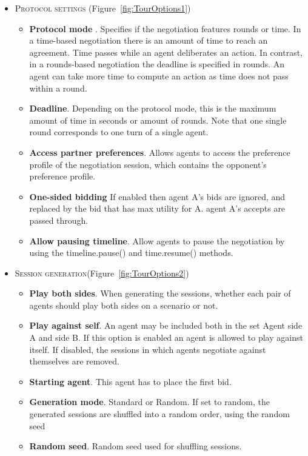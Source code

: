 \documentclass[]{article}
\begin{document}
\begin{itemize}
	\item \textsc{Protocol settings} (Figure~\ref{fig:TourOptions1})
	\begin{itemize}
		\item \textbf{Protocol mode} . Specifies if the negotiation features rounds or time. In a time-based negotiation there is an amount of time to reach an agreement. Time passes while an agent deliberates an action. In contrast, in a rounds-based negotiation the deadline is specified in rounds. An agent can take more time to compute an action as time does not pass within a round.
		\item \textbf{Deadline}. Depending on the protocol mode, this is the maximum amount of time in seconds or amount of rounds. Note that one single round corresponds to one turn of a single agent.
		\item \textbf{Access partner preferences}. Allows agents to access the preference profile of the negotiation session, which contains the opponent's preference profile.
		\item \textbf{One-sided bidding} If enabled then agent A's bids are ignored, and replaced by the bid that has max utility for A. agent A's accepts are passed through.
		\item \textbf{Allow pausing timeline}. Allow agents to pause the negotiation by using the timeline.pause() and time.resume() methods.
	\end{itemize}
	\item \textsc{Session generation}(Figure~\ref{fig:TourOptions2})
	\begin{itemize}
		\item \textbf{Play both sides}. When generating the sessions, whether each pair of agents should play both sides on a scenario or not.
		\item \textbf{Play against self}. An agent may be included both in the set Agent side A and side B. If this option is enabled an agent is allowed to play against itself. If disabled, the sessions in which agents negotiate against themselves are removed.
		\item \textbf{Starting agent}. This agent has to place the first bid.
		\item \textbf{Generation mode}. Standard or Random. If set to random, the generated sessions are shuffled into a random order, using the random seed
		\item \textbf{Random seed}. Random seed used for shuffling sessions.
	\end{itemize}




\end{itemize}
\end{document}
